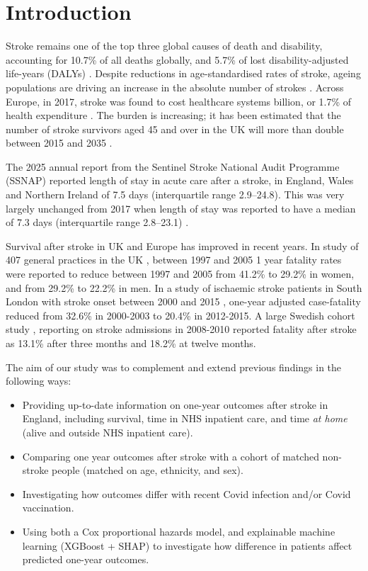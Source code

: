 \section{Introduction}

Stroke remains one of the top three global causes of death and disability, accounting for 10.7\% of all deaths globally, and 5.7\% of lost disability-adjusted life-years (DALYs)  \cite{feigin_global_2021}. Despite reductions in age-standardised rates of stroke, ageing populations are driving an increase in the absolute number of strokes \cite{feigin_global_2021}. Across Europe, in 2017, stroke was found to cost healthcare systems  billion, or 1.7\% of health expenditure \cite{luengo-fernandez_economic_2020}. The burden is increasing; it has been estimated that the number of stroke survivors aged 45 and over in the UK will more than double between 2015 and 2035 \cite{king_future_2020}.

The 2025 annual report from the Sentinel Stroke National Audit Programme (SSNAP) \cite{healthcare_quality_improvement_partnership_sentinel_2025} reported length of stay in acute care after a stroke, in England, Wales and Northern Ireland of 7.5 days (interquartile range 2.9–24.8). This was very largely unchanged from 2017 when length of stay was reported to have a median of 7.3 days (interquartile range 2.8–23.1) \cite{rodgers_stroke_2017}. 

Survival after stroke in UK and Europe has improved in recent years. In study of 407 general practices in the UK \cite{gulliford_declining_2010}, between 1997 and 2005 1 year fatality rates were reported to reduce between 1997 and 2005 from 41.2\% to 29.2\% in women, and from 29.2\% to 22.2\% in men. In a study of ischaemic stroke patients in South London with stroke onset between 2000 and 2015 \cite{wafa_long-term_2020}, one-year adjusted case-fatality reduced from 32.6\% in 2000-2003 to 20.4\% in 2012-2015. A large Swedish cohort study \cite{ullberg_changes_2015}, reporting on stroke admissions in 2008-2010 reported fatality after stroke as 13.1\% after three months and 18.2\% at twelve months.

The aim of our study was to complement and extend previous findings in the following ways:

\begin{itemize}
    \item Providing up-to-date information on one-year outcomes after stroke in England, including survival, time in NHS inpatient care, and time \textit{at home} (alive and outside NHS inpatient care).
    \item Comparing one year outcomes after stroke with a cohort of matched non-stroke people (matched on age, ethnicity, and sex).
    \item Investigating how outcomes differ with recent Covid infection and/or Covid vaccination.
    \item Using both a Cox proportional hazards model, and explainable machine learning (XGBoost + SHAP) to investigate how difference in patients affect predicted one-year outcomes.
\end{itemize}
